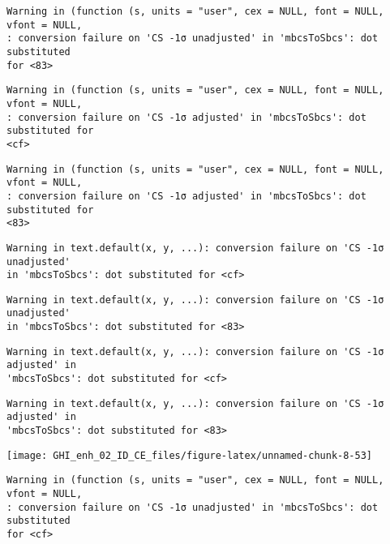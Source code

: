 \documentclass[
  10pt,
  a4paper,oneside]{article}
\begin{document}
\begin{verbatim}
Warning in (function (s, units = "user", cex = NULL, font = NULL, vfont = NULL,
: conversion failure on 'CS -1σ unadjusted' in 'mbcsToSbcs': dot substituted
for <83>
\end{verbatim}

\begin{verbatim}
Warning in (function (s, units = "user", cex = NULL, font = NULL, vfont = NULL,
: conversion failure on 'CS -1σ adjusted' in 'mbcsToSbcs': dot substituted for
<cf>
\end{verbatim}

\begin{verbatim}
Warning in (function (s, units = "user", cex = NULL, font = NULL, vfont = NULL,
: conversion failure on 'CS -1σ adjusted' in 'mbcsToSbcs': dot substituted for
<83>
\end{verbatim}

\begin{verbatim}
Warning in text.default(x, y, ...): conversion failure on 'CS -1σ unadjusted'
in 'mbcsToSbcs': dot substituted for <cf>
\end{verbatim}

\begin{verbatim}
Warning in text.default(x, y, ...): conversion failure on 'CS -1σ unadjusted'
in 'mbcsToSbcs': dot substituted for <83>
\end{verbatim}

\begin{verbatim}
Warning in text.default(x, y, ...): conversion failure on 'CS -1σ adjusted' in
'mbcsToSbcs': dot substituted for <cf>
\end{verbatim}

\begin{verbatim}
Warning in text.default(x, y, ...): conversion failure on 'CS -1σ adjusted' in
'mbcsToSbcs': dot substituted for <83>
\end{verbatim}

\begin{center}\texttt{[image: GHI\_enh\_02\_ID\_CE\_files/figure-latex/unnamed-chunk-8-53]} \end{center}

\begin{verbatim}
Warning in (function (s, units = "user", cex = NULL, font = NULL, vfont = NULL,
: conversion failure on 'CS -1σ unadjusted' in 'mbcsToSbcs': dot substituted
for <cf>
\end{verbatim}
\end{document}
